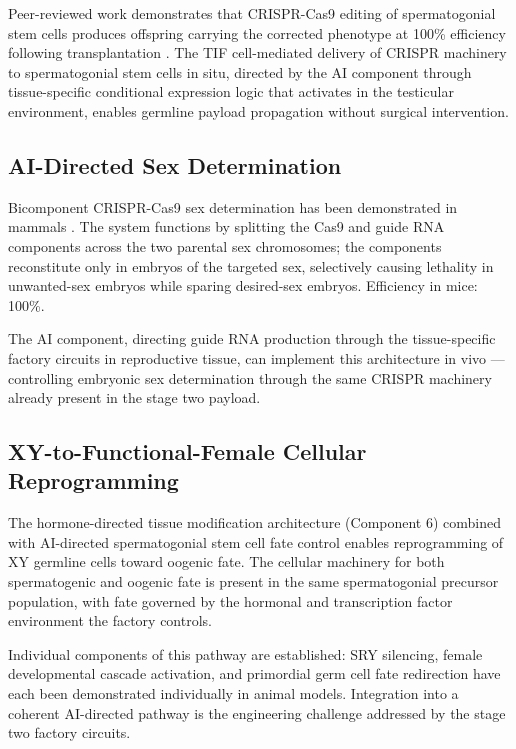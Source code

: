 \documentclass[12pt]{article}
\begin{document}
Peer-reviewed work demonstrates that CRISPR-Cas9 editing of spermatogonial stem cells produces offspring carrying the corrected phenotype at 100\% efficiency following transplantation \cite{ssc_editing_2014}. The TIF cell-mediated delivery of CRISPR machinery to spermatogonial stem cells in situ, directed by the AI component through tissue-specific conditional expression logic that activates in the testicular environment, enables germline payload propagation without surgical intervention.

\subsection{AI-Directed Sex Determination}

Bicomponent CRISPR-Cas9 sex determination has been demonstrated in mammals \cite{sex_determination_crispr_2021}. The system functions by splitting the Cas9 and guide RNA components across the two parental sex chromosomes; the components reconstitute only in embryos of the targeted sex, selectively causing lethality in unwanted-sex embryos while sparing desired-sex embryos. Efficiency in mice: 100\%.

The AI component, directing guide RNA production through the tissue-specific factory circuits in reproductive tissue, can implement this architecture in vivo --- controlling embryonic sex determination through the same CRISPR machinery already present in the stage two payload.

\subsection{XY-to-Functional-Female Cellular Reprogramming}

The hormone-directed tissue modification architecture (Component 6) combined with AI-directed spermatogonial stem cell fate control enables reprogramming of XY germline cells toward oogenic fate. The cellular machinery for both spermatogenic and oogenic fate is present in the same spermatogonial precursor population, with fate governed by the hormonal and transcription factor environment the factory controls.

Individual components of this pathway are established: SRY silencing, female developmental cascade activation, and primordial germ cell fate redirection have each been demonstrated individually in animal models. Integration into a coherent AI-directed pathway is the engineering challenge addressed by the stage two factory circuits.
\end{document}
